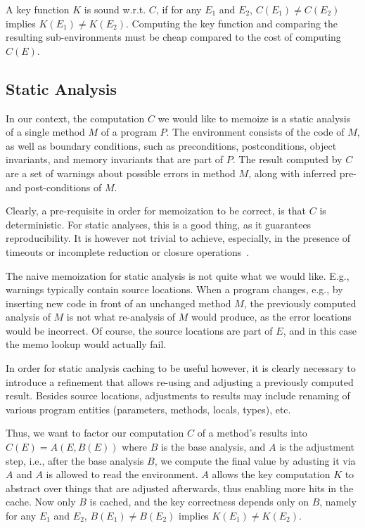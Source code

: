 \documentclass{llncs}
\begin{document}
A key function $K$ is sound w.r.t. $C$, if for any $E_1$ and $E_2$,
$C(E_1) \not= C(E_2)$ implies $K(E_1) \not= K(E_2)$. Computing the key
function and comparing the resulting sub-environments must be cheap
compared to the cost of computing $C(E)$.

\subsection{Static Analysis}
In our context, the computation $C$ we would like to memoize is a
static analysis of a single method $M$ of a program $P$. The
environment consists of the code of $M$, as well as boundary
conditions, such as preconditions, postconditions, object invariants,
and memory invariants that are part of $P$. The result computed by $C$
are a set of warnings about possible errors in method $M$, along with
inferred pre- and post-conditions of $M$.

Clearly, a pre-requisite in order for memoization to be correct, is
that $C$ is deterministic. For static analyses, this is a good thing,
as it guarantees reproducibility. 
It is however not trivial to achieve, especially, in the presence of timeouts or incomplete reduction or closure operations~\cite{subpolyhedra}.

The naive memoization for static analysis is not quite what
we would like. E.g., warnings typically contain source locations. When
a program changes, e.g., by inserting new code in front of an
unchanged method $M$, the previously computed analysis of $M$ is not
what re-analysis of $M$ would produce, as the error locations would be
incorrect. Of course, the source locations are part of $E$, and in
this case the memo lookup would actually fail.

In order for static analysis caching to be useful however, it is
clearly necessary to introduce a refinement that allows re-using and
adjusting a previously computed result. Besides source locations,
adjustments to results may include renaming of various program
entities (parameters, methods, locals, types), etc.

Thus, we want to factor our computation $C$ of a method's results into
$C(E) = A(E,B(E))$ where $B$ is the base analysis, and $A$ is the
adjustment step, i.e., after the base analysis $B$, we compute the
final value by adusting it via $A$ and $A$ is allowed to read the
environment.  $A$ allows the key computation $K$ to abstract over
things that are adjusted afterwards, thus enabling more hits in the
cache.  Now only $B$ is cached, and the key correctness depends only on $B$, namely
for any $E_1$ and $E_2$, $B(E_1) \not= B(E_2)$ implies $K(E_1)\not=
K(E_2)$.
\end{document}
